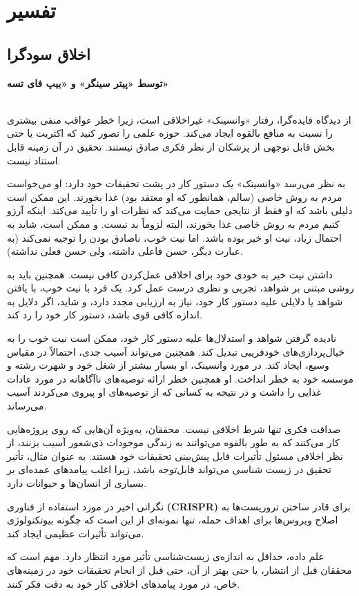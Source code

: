 {
\section*{تفسیر}
\label{sec:تفسیر}


\subsection*{اخلاق سودگرا}
\label{subsec:اخلاق سودگرا}
\textbf{توسط «پیتر سینگر» و «ییپ فای تسه»}
\\\\
}
از دیدگاه فایده‌گرا، رفتار «وانسینک» غیراخلاقی است، زیرا خطر عواقب منفی بیشتری را نسبت به منافع بالقوه ایجاد می‌کند.
حوزه علمی را تصور کنید که اکثریت یا حتی بخش قابل توجهی از پزشکان از نظر فکری صادق نیستند.
تحقیق در آن زمینه قابل استناد نیست.

به نظر می‌رسد «وانسینک» یک دستور کار در پشت تحقیقات خود دارد: او می‌خواست مردم به روش خاصی (سالم، همانطور که او معتقد بود) غذا بخورند.
این ممکن است دلیلی باشد که او فقط از نتایجی حمایت می‌کند که نظرات او را تأیید می‌کند.
اینکه آرزو کنیم مردم به روش خاصی غذا بخورند، البته لزوماً بد نیست.
و ممکن است، شاید به احتمال زیاد، نیت او خیر بوده باشد.
اما نیت خوب، ناصادق بودن را توجیه نمی‌کند (به عبارت دیگر، حسن فاعلی داشته، ولی حسن فعلی نداشته).

داشتن نیت خیر به خودی خود برای اخلاقی عمل‌کردن کافی نیست.
همچنین باید به روشی مبتنی بر شواهد، تجربی و نظری درست عمل کرد.
یک فرد با نیت خوب، با یافتن شواهد یا دلایلی علیه دستور کار خود، نیاز به ارزیابی مجدد دارد، و شاید، اگر دلایل به اندازه کافی قوی باشد، دستور کار خود را رد کند.

نادیده گرفتن شواهد و استدلال‌ها علیه دستور کار خود، ممکن است نیت خوب را به خیال‌پردازی‌های خودفریبی تبدیل کند.
همچنین می‌تواند آسیب جدی، احتمالاً در مقیاس وسیع، ایجاد کند.
در مورد وانسینک، او بسیار بیشتر از شغل خود و شهرت رشته و موسسه خود به خطر انداخت.
او همچنین خطر ارائه توصیه‌های ناآگاهانه در مورد عادات غذایی را داشت و در نتیجه به کسانی که از توصیه‌های او پیروی می‌کردند آسیب می‌رساند.

صداقت فکری تنها شرط اخلاقی نیست.
محققان، به‌ویژه آن‌هایی که روی پروژه‌هایی کار می‌کنند که به طور بالقوه می‌توانند به زندگی موجودات ذی‌شعور آسیب بزنند، از نظر اخلاقی مسئول تأثیرات قابل پیش‌بینی تحقیقات خود هستند.
به عنوان مثال، تأثیر تحقیق در زیست شناسی می‌تواند قابل‌توجه باشد، زیرا اغلب پیامدهای عمده‌ای بر بسیاری از انسان‌ها و حیوانات دارد.

نگرانی اخیر در مورد استفاده از فناوری \textenglish{\textbf{(CRISPR)}} برای قادر ساختن تروریست‌ها به اصلاح ویروس‌ها برای اهداف حمله، تنها نمونه‌ای از این است که چگونه بیوتکنولوژی می‌تواند تأثیرات عظیمی ایجاد کند.

علم داده، حداقل به اندازه‌ی زیست‌شناسی تأثیر مورد انتظار دارد.
مهم است که محققان قبل از انتشار، یا حتی بهتر از آن، حتی قبل از انجام تحقیقات خود در زمینه‌های خاص، در مورد پیامدهای اخلاقی کار خود به دقت فکر کنند.



